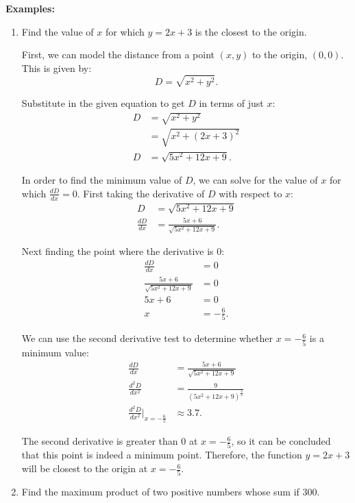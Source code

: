 \noindent \textbf{Examples:}
\begin{enumerate}
	\item Find the value of $x$ for which $y = 2x + 3$ is the closest to the origin.

	First, we can model the distance from a point $(x, y)$ to the origin, $(0, 0)$. This is given by:
	\[ D = \sqrt{x^2 + y^2}. \]

	Substitute in the given equation to get $D$ in terms of just $x$:
	\begin{align*}
		D &= \sqrt{x^2 + y^2} \\
		&= \sqrt{x^2 + (2x + 3)^2} \\
		D &= \sqrt{5x^2 + 12x + 9}.
	\end{align*}

	In order to find the minimum value of $D$, we can solve for the value of $x$ for which $\frac{dD}{dx} = 0$. First taking the derivative of $D$ with respect to $x$:
	\begin{align*}
		D &= \sqrt{5x^2 + 12x + 9} \\
		\frac{dD}{dx} &= \frac{5x + 6}{\sqrt{5x^2 + 12x + 9}}.
	\end{align*}

	Next finding the point where the derivative is $0$:
	\begin{align*}
		\frac{dD}{dx} &= 0 \\[5pt]
		\frac{5x + 6}{\sqrt{5x^2 + 12x + 9}} &= 0 \\[5pt]
		5x + 6 &= 0 \\
		x &= -\frac{6}{5}.
	\end{align*}

	We can use the second derivative test to determine whether $x = -\frac{6}{5}$ is a minimum value:
	\begin{align*}
		\frac{dD}{dx} &= \frac{5x + 6}{\sqrt{5x^2 + 12x + 9}} \\[5pt]
		\frac{d^2 D}{dx^2} &= \frac{9}{\left( 5x^2 + 12x + 9 \right)^{\frac{3}{2}}} \\[5pt]
		\frac{d^2 D}{dx^2} \Big|_{x = -\frac{6}{5}} &\approx 3.7.
	\end{align*}

	The second derivative is greater than $0$ at $x = -\frac{6}{5}$, so it can be concluded that this point is indeed a minimum point. Therefore, the function $y = 2x + 3$ will be closest to the origin at $x = -\frac{6}{5}$.

	\item Find the maximum product of two positive numbers whose sum if $300$.


\end{enumerate}
